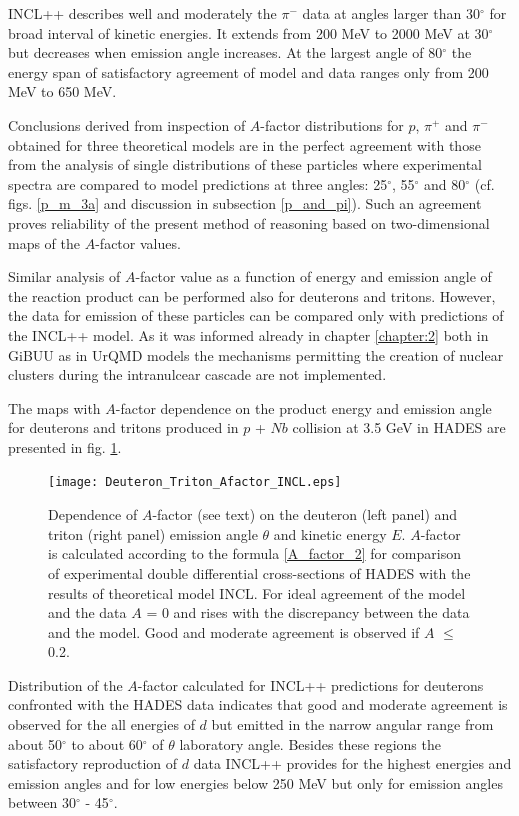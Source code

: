 INCL++ describes well and moderately the $\pi^{-}$ data 
at angles larger than 30$^{\circ}$ for broad interval 
of kinetic energies. It extends from 200 MeV to 2000 MeV at 30$^{\circ}$ but decreases when emission angle increases.  
At the largest angle of 80$^{\circ}$ the energy span of satisfactory 
agreement of model and data ranges only from 200 MeV to 650 MeV.

 \par

Conclusions derived from inspection of $A$-factor distributions for 
$p$, $\pi^{+}$ and $\pi^{-}$ obtained for three theoretical models
are in the perfect agreement with those
from the analysis of single distributions of these particles 
where experimental spectra are compared to model predictions at
three angles: 25$^{\circ}$, 55$^{\circ}$ and 80$^{\circ}$ 
(cf. figs. \ref{p_m_3a} and discussion in subsection \ref{p_and_pi}). 
Such an agreement proves reliability of the present method 
of reasoning based on two-dimensional maps of the $A$-factor values.
 
\par
 
Similar analysis of $A$-factor value as a
function of energy and emission angle of the reaction product can be performed also for deuterons and tritons. However, the
data for emission of these particles can be compared only with
predictions of the INCL++ model. As it was informed already in chapter 
\ref{chapter:2} both in GiBUU as in UrQMD models the mechanisms permitting the creation of nuclear clusters during the intranulcear cascade are not implemented.

The maps with $A$-factor dependence on the product energy 
and emission angle for deuterons and tritons produced in 
$p$ + $Nb$ collision at 3.5 GeV in HADES are presented
in fig. \ref{Afd_t_theta_E}.
\begin{figure}[!hbt]
\texttt{[image: Deuteron\_Triton\_Afactor\_INCL.eps]}%
\caption{\label{Afd_t_theta_E} Dependence of $A$-factor (see text)
on the deuteron (left panel) and triton (right panel) emission angle
$\theta$ and kinetic energy $E$. $A$-factor is calculated according
to the formula \ref{A_factor_2} for comparison of experimental double
differential cross-sections of HADES with the results of theoretical
model INCL. For ideal agreement of the model and the data $A$ = 0
and rises with the discrepancy between the data and the model. Good
and moderate agreement is observed if $A$ $\le$ 0.2. }
\end{figure}
Distribution of the $A$-factor calculated for INCL++ 
predictions for deuterons confronted with the HADES data indicates that good and
moderate agreement is observed for the all energies of $d$ 
but emitted in the narrow angular range from about 50$^{\circ}$ to about 60$^{\circ}$ of $\theta$ laboratory angle.
Besides these regions the satisfactory reproduction of $d$ data 
INCL++ 
provides for the highest energies and emission angles and 
for low energies below 250 MeV but only for emission angles between 
30$^{\circ}$ - 45$^{\circ}$.
 
